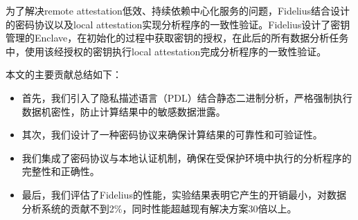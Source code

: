 为了解决remote attestation低效、持续依赖中心化服务的问题，Fidelius结合设计的密码协议以及local attestation实现分析程序的一致性验证。Fidelius设计了密钥管理的Enclave，在初始化的过程中获取密钥的授权，在此后的所有数据分析任务中，使用该经授权的密钥执行local attestation完成分析程序的一致性验证。

本文的主要贡献总结如下：
\begin{itemize}
    \item 首先，我们引入了隐私描述语言（PDL）结合静态二进制分析，严格强制执行数据机密性，防止计算结果中的敏感数据泄露。
    \item 其次，我们设计了一种密码协议来确保计算结果的可靠性和可验证性。
    \item 我们集成了密码协议与本地认证机制，确保在受保护环境中执行的分析程序的完整性和正确性。
    \item 最后，我们评估了Fidelius的性能，实验结果表明它产生的开销最小，对数据分析系统的贡献不到2\%，同时性能超越现有解决方案30倍以上。
\end{itemize} 